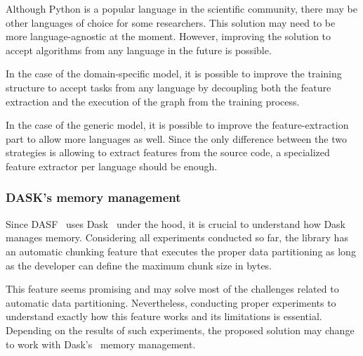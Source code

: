 Although Python is a popular language in the scientific community, there may be other languages of choice for some researchers.
This solution may need to be more language-agnostic at the moment.
However, improving the solution to accept algorithms from any language in the future is possible.

In the case of the domain-specific model, it is possible to improve the training structure to accept tasks from any language by decoupling both the feature extraction and the execution of the graph from the training process.

In the case of the generic model, it is possible to improve the feature-extraction part to allow more languages as well.
Since the only difference between the two strategies is allowing to extract features from the source code, a specialized feature extractor per language should be enough.

\subsubsection{DASK's memory management}

Since \ac{DASF}~\cite{dasf} uses Dask~\cite{dask} under the hood, it is crucial to understand how Dask~\cite{dask} manages memory.
Considering all experiments conducted so far, the library has an automatic chunking feature that executes the proper data partitioning as long as the developer can define the maximum chunk size in bytes.

This feature seems promising and may solve most of the challenges related to automatic data partitioning.
Nevertheless, conducting proper experiments to understand exactly how this feature works and its limitations is essential.
Depending on the results of such experiments, the proposed solution may change to work with Dask's~\cite{dask} memory management.